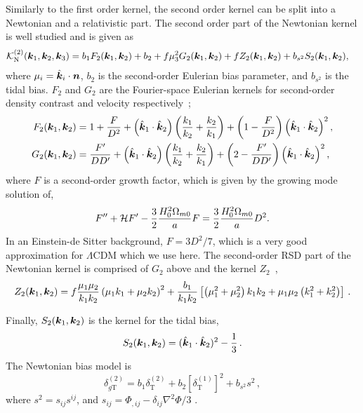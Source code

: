 Similarly to the first order kernel, the second order kernel can be split into a Newtonian and a relativistic part. The second order part of the Newtonian kernel is well studied and is given as~\cite{Bernardeau:2001qr,Karagiannis:2018jdt,Scoccimarro:1999ed,Verde:1998zr}
\begin{align}\label{newt2o}
	\mathcal{K}_\mathrm{N}^{(2)}(\bm {k}_1, \bm {k}_2, \bm {k}_3) &= b_1 F_2(\bm {k}_1,\bm {k}_2) + b_2 + f \mu_3^2 G_2(\bm {k}_1,\bm {k}_2) + f Z_2(\bm {k}_1,\bm {k}_2) + b_{s^2} S_2(\bm {k}_1,\bm {k}_2),
\end{align}
where \(\mu_i = \hat{\bm {k}}_i \cdot \bm {n} \), \( b_2\) is the second-order Eulerian bias parameter, and \(b_{s^2} \) is the tidal bias. \(F_2\) and \(G_2\) are the Fourier-space Eulerian kernels for second-order density contrast and velocity respectively~\cite{Jolicoeur:2017nyt,Villa:2015ppa}; 
\begin{align}
F_2(\bm {k}_1,\bm {k}_2) &= 1 + \frac{F}{D^2} + \left(\hat{\bm {k}}_1 \cdot \hat{\bm {k}}_2 \right)\left( \frac{k_1}{k_2} + \frac{k_2}{k_1}\right) + \left( 1-\frac{F}{D^2}\right) \left(\hat{\bm {k}}_1 \cdot \hat{\bm {k}}_2 \right)^2,\nonumber \\
G_2(\bm {k}_1,\bm {k}_2) &= \frac{F'}{D D'} + \left(\hat{\bm {k}}_1 \cdot \hat{\bm {k}}_2\right)\left(\frac{k_1}{k_2} + \frac{k_2}{k_1} \right) + \left( 2 - \frac{F'}{D D'} \right) \left(\hat{\bm {k}}_1 \cdot \hat{\bm {k}}_2\right)^2,
\end{align}
where \(F\) is a second-order growth factor, which is given by the growing mode solution of,
\begin{equation}
F'' + \mathcal{H} F' - \frac{3}{2}\frac{H_0^2 \Omega_{m0}}{a} F = \frac{3}{2}\frac{H_0^2 \Omega_{m0}}{a} D^2.
\end{equation}
 In an Einstein-de Sitter background, \(F= 3 D^2 / 7\), which is a very good approximation for \(\Lambda\)CDM which we use here. The second-order RSD part of the Newtonian kernel is comprised of \(G_2\) above and the kernel \(Z_2\)~\cite{Verde:1998zr,Scoccimarro:1999ed},
\begin{equation}
	Z_2(\bm {k}_1,\bm {k}_2) = f \frac{\mu_1 \mu_2}{k_1 k_2}\left( \mu_1 k_1 + \mu_2 k_2 \right)^2 + \frac{b_1 }{k_1 k_2} \left[ \left( \mu_1^2 + \mu_2^2 \right)k_1 k_2 + \mu_1 \mu_2 \left( k_1^2 + k_2^2 \right) \right]\,.
\end{equation}

 Finally, \(S_2(\bm {k}_1,\bm {k}_2)\) is the kernel for the tidal bias,
\begin{equation}
	S_2(\bm {k}_1,\bm {k}_2) = (\hat{\bm {k}}_1 \cdot \hat{\bm {k}}_2)^2 - \frac{1}{3}\,.
\end{equation}
The Newtonian bias model is 
\begin{equation}\label{eq:newtbiasmodel}
	\delta_{g\mathrm{T}}^{(2)} = b_1 \delta_\mathrm{T}^{(2)} + b_2 \left[\delta_\mathrm{T}^{(1)}\right]^2 + b_{s^2} s^2\,,
\end{equation}
where \( s^2 = s_{ij}s^{ij}\), and \( s_{ij} = \Phi_{,ij} - \delta_{ij}\nabla^2 \Phi /3\) . 

